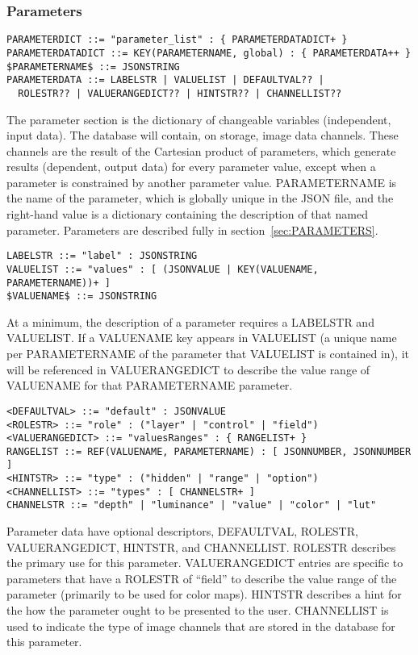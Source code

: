 \subsubsection{Parameters}

\begin{verbatim}
PARAMETERDICT ::= "parameter_list" : { PARAMETERDATADICT+ }
PARAMETERDATADICT ::= KEY(PARAMETERNAME, global) : { PARAMETERDATA++ } 
$PARAMETERNAME$ ::= JSONSTRING
PARAMETERDATA ::= LABELSTR | VALUELIST | DEFAULTVAL?? | 
  ROLESTR?? | VALUERANGEDICT?? | HINTSTR?? | CHANNELLIST??  
\end{verbatim}

The parameter section is the dictionary of changeable  
variables (independent,
input data). The database will contain,
on storage, image data channels.
These channels
are the result of the Cartesian product of parameters,
which generate
results (dependent, output data)
for every parameter value, except when a parameter is
constrained by another parameter value. 
PARAMETERNAME is the name of the parameter, which
is globally unique in the JSON file, and the right-hand
value is a dictionary containing the description
of that named parameter. 
Parameters are described fully in
section~\ref{sec:PARAMETERS}. 

\begin{verbatim}
LABELSTR ::= "label" : JSONSTRING
VALUELIST ::= "values" : [ (JSONVALUE | KEY(VALUENAME, PARAMETERNAME))+ ]
$VALUENAME$ ::= JSONSTRING
\end{verbatim}

At a minimum, the description of a
parameter requires a LABELSTR and VALUELIST.
If a VALUENAME key appears in VALUELIST
(a unique name per PARAMETERNAME of the parameter that VALUELIST
is contained in), 
it will be referenced
in VALUERANGEDICT to describe the value range of VALUENAME
for that PARAMETERNAME parameter.

\begin{verbatim}
<DEFAULTVAL> ::= "default" : JSONVALUE
<ROLESTR> ::= "role" : ("layer" | "control" | "field")
<VALUERANGEDICT> ::= "valuesRanges" : { RANGELIST+ }
RANGELIST ::= REF(VALUENAME, PARAMETERNAME) : [ JSONNUMBER, JSONNUMBER ] 
<HINTSTR> ::= "type" : ("hidden" | "range" | "option")
<CHANNELLIST> ::= "types" : [ CHANNELSTR+ ]
CHANNELSTR ::= "depth" | "luminance" | "value" | "color" | "lut"
\end{verbatim}

Parameter data have optional descriptors, DEFAULTVAL, ROLESTR,
VALUERANGEDICT, HINTSTR, and CHANNELLIST.
ROLESTR describes the primary use for this parameter.
VALUERANGEDICT entries are specific to
parameters that have a
ROLESTR of ``field'' to describe the value range of the parameter
(primarily to be used for color maps).
HINTSTR describes a hint for the how the parameter ought to be 
presented to the user.
CHANNELLIST is used to indicate the type of image
channels that are stored in the database for this parameter.

